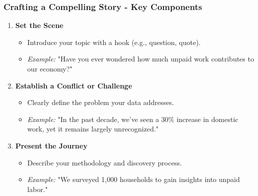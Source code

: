 \documentclass[aspectratio=169]{beamer}
\begin{document}
\begin{frame}[fragile]
    \frametitle{Crafting a Compelling Story - Key Components}
    \begin{enumerate}
        \item \textbf{Set the Scene}
            \begin{itemize}
                \item Introduce your topic with a hook (e.g., question, quote).
                \item \textit{Example:} "Have you ever wondered how much unpaid work contributes to our economy?"
            \end{itemize}
        \item \textbf{Establish a Conflict or Challenge}
            \begin{itemize}
                \item Clearly define the problem your data addresses.
                \item \textit{Example:} "In the past decade, we’ve seen a 30\% increase in domestic work, yet it remains largely unrecognized."
            \end{itemize}
        \item \textbf{Present the Journey}
            \begin{itemize}
                \item Describe your methodology and discovery process.
                \item \textit{Example:} "We surveyed 1,000 households to gain insights into unpaid labor."
            \end{itemize}
    \end{enumerate}
\end{frame}
\end{document}
